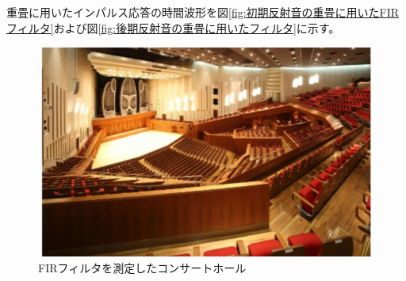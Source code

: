 \documentclass[11pt,a4j]{jreport}
\begin{document}
重畳に用いたインパルス応答の時間波形を図\ref{fig:初期反射音の重畳に用いたFIRフィルタ}および図\ref{fig:後期反射音の重畳に用いたフィルタ}に示す。

\begin{figure}[H]
  \centering
  \includegraphics[width=.5\linewidth]{images/convolutedIrHall.jpg}
  \caption{FIRフィルタを測定したコンサートホール}
  \label{fig:FIRフィルタを測定したコンサートホール}
\end{figure}

\newpage
\end{document}
